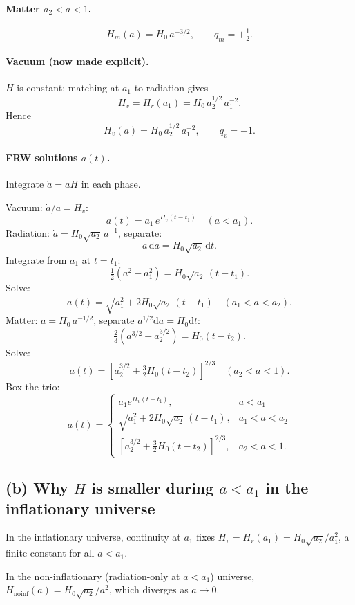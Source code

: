 \documentclass[11pt]{article}
\newcommand{\de}{\mathrm{d}}
\begin{document}
\paragraph{Matter $a_2<a<1$.}
\[
\boxed{\;H_m(a) = H_0\,a^{-3/2},\qquad q_m = +\tfrac12.\;}
\]

\paragraph{Vacuum (now made explicit).} $H$ is constant; matching at $a_1$ to radiation gives
\[
H_v = H_r(a_1) = H_0\,a_2^{1/2}\,a_1^{-2}.
\]
Hence
\[
\boxed{\;H_v(a) = H_0\,a_2^{1/2}\,a_1^{-2},\qquad q_v = -1.\;}
\]

\paragraph{FRW solutions $a(t)$.} Integrate $\dot a = a H$ in each phase.

Vacuum: $\dot a / a = H_v$:
\[
a(t) = a_1\,e^{H_v(t-t_1)}\quad(a<a_1).
\]
Radiation: $\dot a = H_0\sqrt{a_2}\,a^{-1}$, separate:
\[
a\,\de a = H_0\sqrt{a_2}\,\de t.
\]
Integrate from $a_1$ at $t=t_1$:
\[
\tfrac12(a^2-a_1^2) = H_0\sqrt{a_2}\,(t-t_1).
\]
Solve:
\[
a(t) = \sqrt{a_1^2 + 2 H_0\sqrt{a_2}\,(t-t_1)}\quad(a_1<a<a_2).
\]
Matter: $\dot a = H_0\,a^{-1/2}$, separate $a^{1/2}\de a = H_0\de t$:
\[
\tfrac{2}{3}(a^{3/2}-a_2^{3/2}) = H_0(t-t_2).
\]
Solve:
\[
a(t) = \!\left[a_2^{3/2} + \tfrac{3}{2}H_0(t-t_2)\right]^{2/3}\quad(a_2<a<1).
\]
Box the trio:
\[
\boxed{\;a(t)=\begin{cases} a_1 e^{H_v(t-t_1)}, & a<a_1\\[2pt] \sqrt{a_1^2 + 2 H_0\sqrt{a_2}\,(t-t_1)}, & a_1<a<a_2\\[2pt] \!\left[a_2^{3/2}+\tfrac{3}{2}H_0(t-t_2)\right]^{2/3}, & a_2<a<1.\end{cases}\;}
\]

\subsection*{(b) Why $H$ is smaller during $a<a_1$ in the inflationary universe}

In the inflationary universe, continuity at $a_1$ fixes $H_v = H_r(a_1) = H_0\sqrt{a_2}/a_1^2$, a finite constant for all $a<a_1$.

In the non-inflationary (radiation-only at $a<a_1$) universe, $H_{\mathrm{noinf}}(a) = H_0\sqrt{a_2}/a^2$, which diverges as $a\to 0$.
\end{document}
